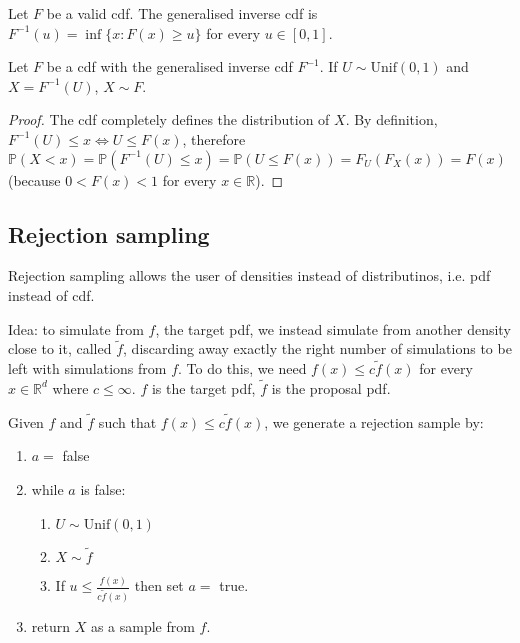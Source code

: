 \begin{definition}
	Let $F$ be a valid cdf. The generalised inverse cdf is $F^{-1}(u) = \inf \{x: F(x) \ge u \}$ for every $u \in [0, 1]$.
\end{definition}

\begin{theorem}
	Let $F$ be a cdf with the generalised inverse cdf $F^{-1}$. If $U \sim \text{Unif}(0, 1)$ and $X = F^{-1}(U)$, $X \sim F$.
\end{theorem}

\begin{proof}
	The cdf completely defines the distribution of $X$. By definition, $F^{-1}(U) \le x \Leftrightarrow U \le F(x)$, therefore $\mathbb{P}(X < x) = \mathbb{P}(F^{-1}(U) \le x) = \mathbb{P}(U \le F(x)) = F_U(F_X(x)) = F(x)$ (because $0 < F(x) < 1$ for every $x \in \mathbb{R}$).
\end{proof}

\subsection{Rejection sampling}

Rejection sampling allows the user of densities instead of distributinos, i.e. pdf instead of cdf.

Idea: to simulate from $f$, the target pdf, we instead simulate from another density close to it, called $\tilde{f}$, discarding away exactly the right number of simulations to be left with simulations from $f$. To do this, we need $f(x) \le c \tilde{f}(x)$ for every $x \in \mathbb{R}^d$ where $c \le \infty$. $f$ is the target pdf, $\tilde{f}$ is the proposal pdf.

\begin{definition}
	Given $f$ and $\tilde{f}$ such that $f(x) \le c \tilde{f}(x)$, we generate a rejection sample by:

	\begin{enumerate}
		\item $a = $ false
		\item while $a$ is false:
		\begin{enumerate}
			\item $U \sim \text{Unif}(0, 1)$
			\item $X \sim \tilde{f}$
			\item If $u \le \frac{f(x)}{c\tilde{f}(x)}$ then set $a = $ true.
		\end{enumerate}
		\item return $X$ as a sample from $f$.
	\end{enumerate}
\end{definition}

